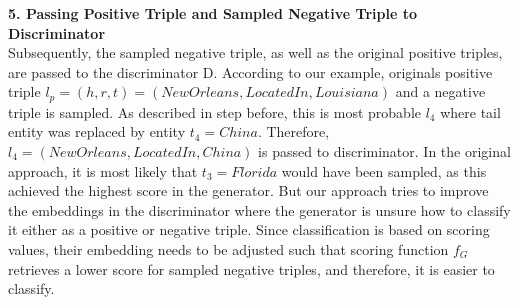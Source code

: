 \textbf{5. Passing Positive Triple and Sampled Negative Triple to Discriminator}\\
%
Subsequently, the sampled negative triple, as well as the original positive triples, are passed to the discriminator D.
According to our example, originals positive triple $l_p = (h,r,t) = (NewOrleans, LocatedIn, Louisiana)$ and a negative triple is sampled.
As described in step before, this is most probable $l_4$ where tail entity was replaced by entity $t_4 = China$.
Therefore, $l_4 = (NewOrleans, LocatedIn, China)$ is passed to discriminator.
In the original approach, it is most likely that $t_3 = Florida$ would have been sampled, as this achieved the highest score in the generator.
But our approach tries to improve the embeddings in the discriminator where the generator is unsure how to classify it either as a positive or negative triple.
Since classification is based on scoring values, their embedding needs to be adjusted such that scoring function $f_G$ retrieves a lower score for sampled negative triples, and therefore, it is easier to classify.



